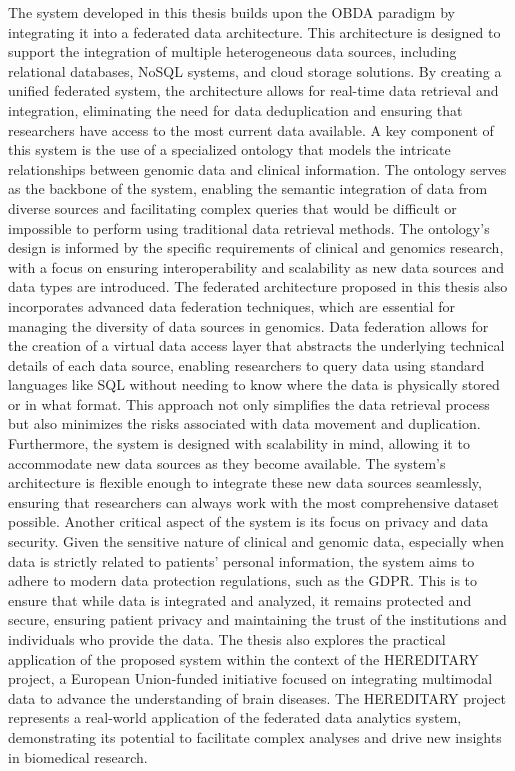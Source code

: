 The system developed in this thesis builds upon the OBDA paradigm by integrating it into a federated data architecture. This architecture is designed to support the integration of multiple heterogeneous data sources, including relational databases, NoSQL systems, and cloud storage solutions. By creating a unified federated system, the architecture allows for real-time data retrieval and integration, eliminating the need for data deduplication and ensuring that researchers have access to the most current data available.
A key component of this system is the use of a specialized ontology that models the intricate relationships between genomic data and clinical information. The ontology serves as the backbone of the system, enabling the semantic integration of data from diverse sources and facilitating complex queries that would be difficult or impossible to perform using traditional data retrieval methods. The ontology's design is informed by the specific requirements of clinical and genomics research, with a focus on ensuring interoperability and scalability as new data sources and data types are introduced.
The federated architecture proposed in this thesis also incorporates advanced data federation techniques, which are essential for managing the diversity of data sources in genomics. Data federation allows for the creation of a virtual data access layer that abstracts the underlying technical details of each data source, enabling researchers to query data using standard languages like SQL without needing to know where the data is physically stored or in what format. This approach not only simplifies the data retrieval process but also minimizes the risks associated with data movement and duplication.
Furthermore, the system is designed with scalability in mind, allowing it to accommodate new data sources as they become available. The system's architecture is flexible enough to integrate these new data sources seamlessly, ensuring that researchers can always work with the most comprehensive dataset possible.
Another critical aspect of the system is its focus on privacy and data security. Given the sensitive nature of clinical and genomic data, especially when data is strictly related to patients’ personal information, the system aims to adhere to modern data protection regulations, such as the \ac{GDPR}. This is to ensure that while data is integrated and analyzed, it remains protected and secure, ensuring patient privacy and maintaining the trust of the institutions and individuals who provide the data.
The thesis also explores the practical application of the proposed system within the context of the HEREDITARY project, a European Union-funded initiative focused on integrating multimodal data to advance the understanding of brain diseases. The HEREDITARY project represents a real-world application of the federated data analytics system, demonstrating its potential to facilitate complex analyses and drive new insights in biomedical research.
